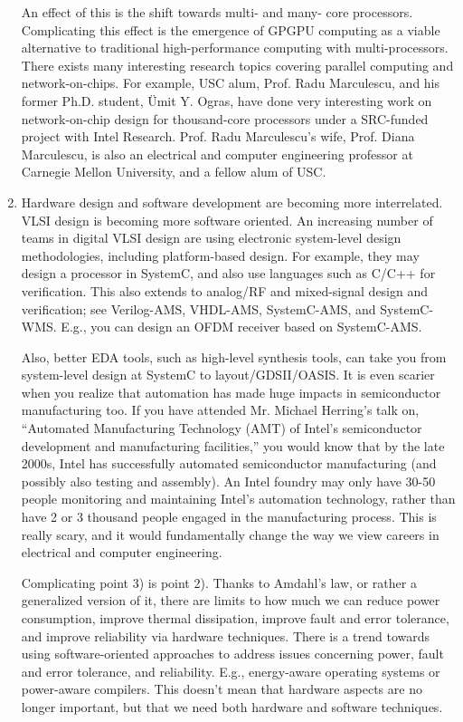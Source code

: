 \begin{enumerate}
An effect of this is the shift towards multi- and many- core processors. Complicating this effect is the emergence of GPGPU computing as a viable alternative to traditional high-performance computing with multi-processors. There exists many interesting research topics covering parallel computing and network-on-chips. For example, USC alum, Prof. Radu Marculescu, and his former Ph.D. student, {\"{U}}mit Y. Ogras, have done very interesting work on network-on-chip design for thousand-core processors under a SRC-funded project with Intel Research. Prof. Radu Marculescu's wife, Prof. Diana Marculescu, is also an electrical and computer engineering professor at Carnegie Mellon University, and a fellow alum of USC.
\item Hardware design and software development are becoming more interrelated. VLSI design is becoming more software oriented. An increasing number of teams in digital VLSI design are using electronic system-level design methodologies, including platform-based design. For example, they may design a processor in SystemC, and also use languages such as C/C++ for verification. This also extends to analog/RF and mixed-signal design and verification; see Verilog-AMS, VHDL-AMS, SystemC-AMS, and SystemC-WMS. E.g., you can design an OFDM receiver based on SystemC-AMS.

Also, better EDA tools, such as high-level synthesis tools, can take you from system-level design at SystemC to layout/GDSII/OASIS. It is even scarier when you realize that automation has made huge impacts in semiconductor manufacturing too. If you have attended Mr. Michael Herring's talk on, ``Automated Manufacturing Technology (AMT) of Intel's semiconductor development and manufacturing facilities,'' you would know that by the late 2000s, Intel has successfully automated semiconductor manufacturing (and possibly also testing and assembly). An Intel foundry may only have 30-50 people monitoring and maintaining Intel's automation technology, rather than have 2 or 3 thousand people engaged in the manufacturing process. This is really scary, and it would fundamentally change the way we view careers in electrical and computer engineering.

Complicating point 3) is point 2). Thanks to Amdahl's law, or rather a generalized version of it, there are limits to how much we can reduce power consumption, improve thermal dissipation, improve fault and error tolerance, and improve reliability via hardware techniques. There is a trend towards using software-oriented approaches to address issues concerning power, fault and error tolerance, and reliability. E.g., energy-aware operating systems or power-aware compilers. This doesn't mean that hardware aspects are no longer important, but that we need both hardware and software techniques.


\end{enumerate}
